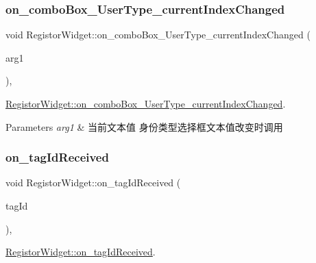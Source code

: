\mbox{\label{class_registor_widget_a088f8bd641902d9be5eeacecd0cddcdc}} 
\subsubsection{\texorpdfstring{on\_comboBox\_UserType\_currentIndexChanged}{on\_comboBox\_UserType\_currentIndexChanged}}
{\footnotesize\ttfamily void Registor\+Widget\+::on\+\_\+combo\+Box\+\_\+\+User\+Type\+\_\+current\+Index\+Changed (\begin{DoxyParamCaption}\item[{const Q\+String \&}]{arg1 }\end{DoxyParamCaption})\hspace{0.3cm}{\ttfamily [private]}, {\ttfamily [slot]}}



\mbox{\hyperlink{class_registor_widget_a088f8bd641902d9be5eeacecd0cddcdc}{Registor\+Widget\+::on\+\_\+combo\+Box\+\_\+\+User\+Type\+\_\+current\+Index\+Changed}}. 


\begin{DoxyParams}{Parameters}
{\em arg1} & 当前文本值 身份类型选择框文本值改变时调用 \\
\hline
\end{DoxyParams}
\mbox{\label{class_registor_widget_a7f2af14f69efa2bdc0d57f9957cc1dc1}} 
\subsubsection{\texorpdfstring{on\_tagIdReceived}{on\_tagIdReceived}}
{\footnotesize\ttfamily void Registor\+Widget\+::on\+\_\+tag\+Id\+Received (\begin{DoxyParamCaption}\item[{Q\+String}]{tag\+Id }\end{DoxyParamCaption})\hspace{0.3cm}{\ttfamily [private]}, {\ttfamily [slot]}}



\mbox{\hyperlink{class_registor_widget_a7f2af14f69efa2bdc0d57f9957cc1dc1}{Registor\+Widget\+::on\+\_\+tag\+Id\+Received}}. 


